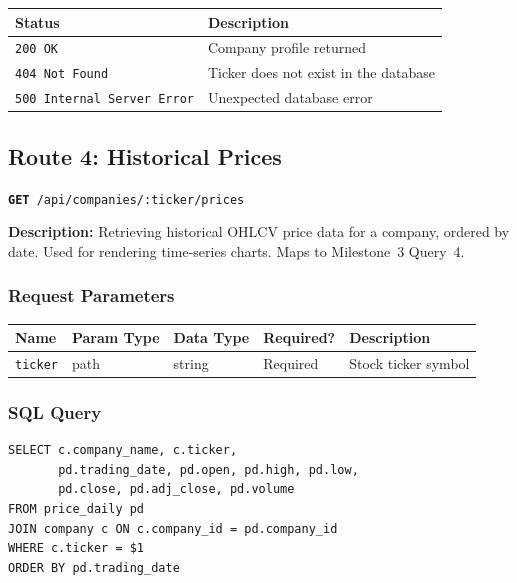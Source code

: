 \documentclass[11pt]{article}
\newcommand{\route}[2]{\texttt{\textcolor{routecolor}{\textbf{#1}}~#2}}
\begin{document}
\begin{center}
\small
\begin{tabular}{l p{8cm}}
\toprule
\textbf{Status} & \textbf{Description} \\
\midrule
\texttt{200 OK} & Company profile returned \\
\texttt{404 Not Found} & Ticker does not exist in the database \\
\texttt{500 Internal Server Error} & Unexpected database error \\
\bottomrule
\end{tabular}
\end{center}

\newpage
\subsection{Route 4: Historical Prices}

\route{GET}{/api/companies/:ticker/prices}

\medskip\noindent
\textbf{Description:} Retrieving historical OHLCV price data for a company, ordered by date. Used for rendering time-series charts. Maps to Milestone~3 Query~4.

\subsubsection*{Request Parameters}

\begin{center}
\small
\begin{tabular}{l l l l p{5cm}}
\toprule
\textbf{Name} & \textbf{Param Type} & \textbf{Data Type} & \textbf{Required?} & \textbf{Description} \\
\midrule
\texttt{ticker} & path & string & Required & Stock ticker symbol \\
\bottomrule
\end{tabular}
\end{center}

\subsubsection*{SQL Query}
\begin{lstlisting}[style=sql,basicstyle=\ttfamily\scriptsize]
SELECT c.company_name, c.ticker,
       pd.trading_date, pd.open, pd.high, pd.low,
       pd.close, pd.adj_close, pd.volume
FROM price_daily pd
JOIN company c ON c.company_id = pd.company_id
WHERE c.ticker = $1
ORDER BY pd.trading_date
\end{lstlisting}
\end{document}
